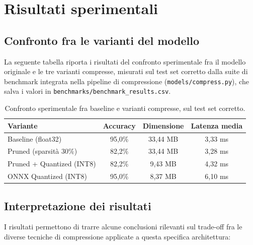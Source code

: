 \section{Risultati sperimentali}
\label{sec:risultati}

\subsection{Confronto fra le varianti del modello}

La seguente tabella riporta i risultati del confronto
sperimentale fra il modello originale e le tre varianti compresse, misurati
sul test set corretto dalla suite di benchmark integrata nella pipeline di
compressione (\texttt{models/compress.py}), che salva i valori in
\texttt{benchmarks/benchmark\_results.csv}.

\begin{table}[h]
\centering
\small
\begin{tabular}{@{}lccc@{}}
\toprule
\textbf{Variante} & \textbf{Accuracy} & \textbf{Dimensione} & \textbf{Latenza media} \\
\midrule
Baseline (float32) & 95,0\% & 33,44 MB & 3,33 ms \\
Pruned (sparsità 30\%) & 82,2\% & 33,44 MB & 3,28 ms \\
Pruned + Quantized (INT8) & 82,2\% & 9,43 MB & 4,32 ms \\
ONNX Quantized (INT8) & 95,0\% & 8,37 MB & 6,10 ms \\
\bottomrule
\end{tabular}
\caption{Confronto sperimentale fra baseline e varianti compresse, sul test set corretto.}
\label{tab:benchmark-finale}
\end{table}

\subsection{Interpretazione dei risultati}

I risultati permettono di trarre alcune conclusioni rilevanti sul
trade-off fra le diverse tecniche di compressione applicate a questa
specifica architettura:

